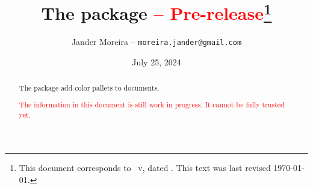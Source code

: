\documentclass[a4paper, 11pt]{article}
\title{%
    The \PackageName{palettize} package \textcolor{red}{ -- Pre-release}\thanks{This document corresponds to \PackageName{palettize}~v\PLTVersion, dated \PLTDate. This text was last revised \today.}%
}
\author{Jander Moreira -- \texttt{moreira.jander@gmail.com}}
\date{July 25, 2024}
\begin{document}
\maketitle
\sloppy

\begin{abstract}
    The  package add color pallets to documents.

    \textcolor{red}{The information in this document is still work in progress. It cannot be fully trusted yet.}
\end{abstract}

%
%
%
%
%
%
%
%
%
%
%
%
%
%
%
\end{document}
